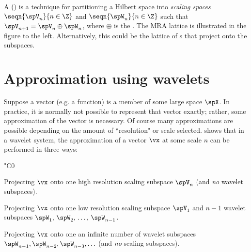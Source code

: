 \parbox[c][][c]{\textwidth/2}{
\begin{example}
\label{ex:lat_mra}
A {\em {}} () is a technique for
partitioning a Hilbert space into {\em scaling spaces} $\seqn{\spV_n}{n\in\Z}$
and {\em{}} $\seqn{\spW_n}{n\in\Z}$ such that
$\spV_{n+1} = \spV_n \oplus \spW_n$, where $\oplus$ is the
{\em{}}.
The MRA lattice is illustrated in the figure to the left.
Alternatively, this could be the lattice of s that
project onto the subspaces.
\end{example}
}


\section{Approximation using wavelets}
Suppose a vector (e.g. a function) is a member of some large space $\spX$.
In practice, it is normally not possible to represent that vector exactly;
rather, some approximation of the vector is necessary.
Of course many approximations are possible depending on the amount of ``resolution"
or scale selected.
 shows that in a wavelet system, 
the approximation of a vector $\vx$ at some scale $n$ can be performed in three ways:
\begin{dingautolist}{"C0}
  \item Projecting $\vx$ onto one high resolution scaling subspace $\spV_n$
        (and {\em no} wavelet subspaces).
  \item Projecting $\vx$ onto one low resolution scaling subspace $\spV_1$ 
        and $n-1$ wavelet subspaces $\spW_1,\,\spW_2,\,\dots,\,\spW_{n-1}$.
  \item Projecting $\vx$ onto one an infinite number of wavelet subspaces
        $\spW_{n-1},\spW_{n-2},\spW_{n-3},\ldots$
        (and {\em no} scaling subspaces).
\end{dingautolist}

